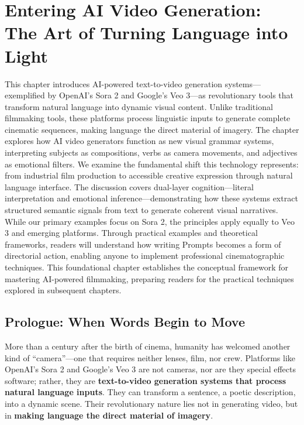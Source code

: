 \chapter{Entering AI Video Generation: The Art of Turning Language into Light}
\label{ch:entering-ai-video}

\begin{chapterabstract}
This chapter introduces AI-powered text-to-video generation systems---exemplified by OpenAI's Sora 2 and Google's Veo 3---as revolutionary tools that transform natural language into dynamic visual content. Unlike traditional filmmaking tools, these platforms process linguistic inputs to generate complete cinematic sequences, making language the direct material of imagery. The chapter explores how AI video generators function as new visual grammar systems, interpreting subjects as compositions, verbs as camera movements, and adjectives as emotional filters. We examine the fundamental shift this technology represents: from industrial film production to accessible creative expression through natural language interface. The discussion covers dual-layer cognition---literal interpretation and emotional inference---demonstrating how these systems extract structured semantic signals from text to generate coherent visual narratives. While our primary examples focus on Sora 2, the principles apply equally to Veo 3 and emerging platforms. Through practical examples and theoretical frameworks, readers will understand how writing Prompts becomes a form of directorial action, enabling anyone to implement professional cinematographic techniques. This foundational chapter establishes the conceptual framework for mastering AI-powered filmmaking, preparing readers for the practical techniques explored in subsequent chapters.
\end{chapterabstract}

\section{Prologue: When Words Begin to Move}

More than a century after the birth of cinema, humanity has welcomed another kind of ``camera''---one that requires neither lenses, film, nor crew. Platforms like OpenAI's Sora 2 and Google's Veo 3 are not cameras, nor are they special effects software; rather, they are \textbf{text-to-video generation systems that process natural language inputs}. They can transform a sentence, a poetic description, into a dynamic scene. Their revolutionary nature lies not in generating video, but in \textbf{making language the direct material of imagery}.


